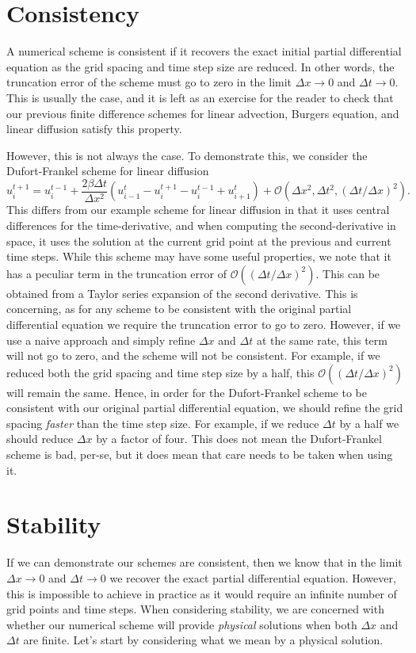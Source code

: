 \section{Consistency}
A numerical scheme is consistent if it recovers the exact initial partial differential equation as the grid spacing and time step size are reduced. In other words, the truncation error of the scheme must go to zero in the limit $\Delta x \rightarrow 0$ and $\Delta t \rightarrow 0$. This is usually the case, and it is left as an exercise for the reader to check that our previous finite difference schemes for linear advection, Burgers equation, and linear diffusion satisfy this property. 

However, this is not always the case. To demonstrate this, we consider the Dufort-Frankel scheme for linear diffusion
\begin{equation}
u_i^{t+1}  = u_{i}^{t-1} + \frac{2 \beta \Delta t}{\Delta x^2} \left(u_{i-1}^t - u_i^{t+1} - u_i^{t-1} + u_{i+1}^t\right) + \mathcal{O}(\Delta x^2,\Delta t^2,(\Delta t/\Delta x)^2).
\end{equation}
This differs from our example scheme for linear diffusion in that it uses central differences for the time-derivative, and when computing the second-derivative in space, it uses the solution at the current grid point at the previous and current time steps. While this scheme may have some useful properties, we note that it has a peculiar term in the truncation error of $\mathcal{O}((\Delta t/\Delta x)^2)$. This can be obtained from a Taylor series expansion of the second derivative. This is concerning, as for any scheme to be consistent with the original partial differential equation we require the truncation error to go to zero. However, if we use a naive approach and simply refine $\Delta x$ and $\Delta t$ at the same rate, this term will not go to zero, and the scheme will not be consistent. For example, if we reduced both the grid spacing and time step size by a half, this $\mathcal{O}((\Delta t/\Delta x)^2)$ will remain the same. Hence, in order for the Dufort-Frankel scheme to be consistent with our original partial differential equation, we should refine the grid spacing {\it faster} than the time step size. For example, if we reduce $\Delta t$ by a half we should reduce $\Delta x$ by a factor of four. This does not mean the Dufort-Frankel scheme is bad, per-se, but it does mean that care needs to be taken when using it.

\section{Stability}
If we can demonstrate our schemes are consistent, then we know that in the limit $\Delta x \rightarrow 0$ and $\Delta t \rightarrow 0$ we recover the exact partial differential equation. However, this is impossible to achieve in practice as it would require an infinite number of grid points and time steps. When considering stability, we are concerned with whether our numerical scheme will provide {\it physical} solutions when both $\Delta x$ and $\Delta t$ are finite. Let's start by considering what we mean by a physical solution.

